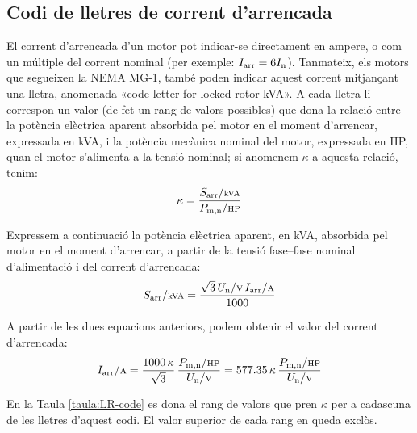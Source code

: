 \subsection{Codi de lletres de corrent d'arrencada}

El corrent d'arrencada d'un motor pot indicar-se directament en ampere, o com un múltiple del corrent nominal (per exemple: $I\ped{arr} = 6 I\ped{n}$). Tanmateix, els motors que segueixen la NEMA MG-1, també poden indicar aquest corrent mitjançant una lletra, anomenada «code letter for locked-rotor kVA». A cada lletra li correspon un valor (de fet un rang de valors possibles) que dona la relació entre la potència elèctrica aparent absorbida pel motor en el moment d'arrencar, expressada en kVA, i la potència mecànica nominal del motor, expressada en HP, quan el motor s'alimenta a la tensió nominal; si anomenem $\kappa$ a aquesta relació, tenim:
\begin{equation}
    \kappa = \frac{S\ped{arr}/{\scriptstyle\si{kVA}}}{P\ped{m,n}/{\scriptstyle \si{HP}}}
\end{equation}

Expressem a continuació la potència elèctrica aparent, en kVA, absorbida pel motor en el moment d'arrencar, a partir de la tensió fase--fase nominal d'alimentació i del corrent d'arrencada:
\begin{equation}
    S\ped{arr}/{\scriptstyle \si{kVA}} = \frac{\sqrt{3}\,U\ped{n}/{\scriptstyle \si{V}}\,I\ped{arr}/{\scriptstyle \si{A}}}{1000}
\end{equation}

A partir de les dues equacions anteriors, podem obtenir el valor del corrent d'arrencada:
\begin{equation}
    I\ped{arr}/{\scriptstyle \si{A}} = \frac{1000 \,\kappa}{\sqrt{3}} \,\frac{P\ped{m,n}/{\scriptstyle \si{HP}}}{U\ped{n}/{\scriptstyle \si{V}}} = \num{577,35}\,\kappa\,\frac{P\ped{m,n}/{\scriptstyle \si{HP}}}{U\ped{n}/{\scriptstyle \si{V}}}\label{eq:LR-code}
\end{equation}

En la Taula \vref{taula:LR-code} es dona el rang de valors que pren $\kappa$ per a cadascuna de les lletres d'aquest codi. El valor superior de cada rang en queda exclòs.

